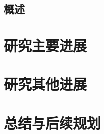 \documentclass{si_template/cn_note}
\begin{document}
\frontmatter
\mainmatter
\section{概述}\label{chap:overview}

\chapter{研究主要进展}\label{chap:main_progress}

\chapter{研究其他进展}\label{chap:other_progress}

\chapter{总结与后续规划}\label{chap:conclusion}

\backmatter
\end{document}
